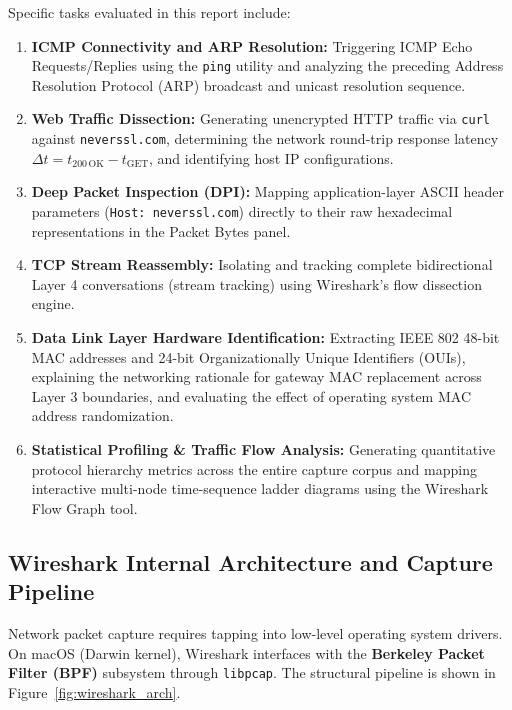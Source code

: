 \documentclass[11pt,a4paper]{article}
\begin{document}
Specific tasks evaluated in this report include:
\begin{enumerate}[leftmargin=*]
    \item \textbf{ICMP Connectivity and ARP Resolution:} Triggering ICMP Echo Requests/Replies using the \texttt{ping} utility and analyzing the preceding Address Resolution Protocol (ARP) broadcast and unicast resolution sequence.
    \item \textbf{Web Traffic Dissection:} Generating unencrypted HTTP traffic via \texttt{curl} against \texttt{neverssl.com}, determining the network round-trip response latency $\Delta t = t_{200\,\text{OK}} - t_{\text{GET}}$, and identifying host IP configurations.
    \item \textbf{Deep Packet Inspection (DPI):} Mapping application-layer ASCII header parameters (\texttt{Host: neverssl.com}) directly to their raw hexadecimal representations in the Packet Bytes panel.
    \item \textbf{TCP Stream Reassembly:} Isolating and tracking complete bidirectional Layer 4 conversations (stream tracking) using Wireshark's flow dissection engine.
    \item \textbf{Data Link Layer Hardware Identification:} Extracting IEEE 802 48-bit MAC addresses and 24-bit Organizationally Unique Identifiers (OUIs), explaining the networking rationale for gateway MAC replacement across Layer 3 boundaries, and evaluating the effect of operating system MAC address randomization.
    \item \textbf{Statistical Profiling \& Traffic Flow Analysis:} Generating quantitative protocol hierarchy metrics across the entire capture corpus and mapping interactive multi-node time-sequence ladder diagrams using the Wireshark Flow Graph tool.
\end{enumerate}

\subsection{Wireshark Internal Architecture and Capture Pipeline}
Network packet capture requires tapping into low-level operating system drivers. On macOS (Darwin kernel), Wireshark interfaces with the \textbf{Berkeley Packet Filter (BPF)} subsystem through \texttt{libpcap}. The structural pipeline is shown in Figure~\ref{fig:wireshark_arch}.
\end{document}
